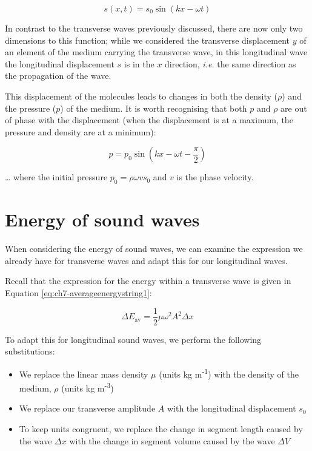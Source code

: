 \documentclass[
]{book}
\providecommand{\tightlist}{%
  \setlength{\itemsep}{0pt}\setlength{\parskip}{0pt}}
\begin{document}
\begin{equation}
s(x,t) = s_0 \sin (kx - \omega t)
\label{eq:ch9-soundwaveeq1}
\end{equation}

In contrast to the transverse waves previously discussed, there are now only two dimensions to this function; while we considered the transverse displacement \(y\) of an element of the medium carrying the transverse wave, in this longitudinal wave the longitudinal displacement \(s\) is in the \(x\) direction, \emph{i.e.} the same direction as the propagation of the wave.

This displacement of the molecules leads to changes in both the density (\(\rho\)) and the pressure (\(p\)) of the medium. It is worth recognising that both \(p\) and \(\rho\) are out of phase with the displacement (when the displacement is at a maximum, the pressure and density are at a minimum):

\begin{equation}
p = p_0 \sin (kx - \omega t - \frac{\pi}{2})
\label{eq:ch9-soundwaveeq2}
\end{equation}

\ldots{} where the initial pressure \(p_0 = \rho \omega v s_0\) and \(v\) is the phase velocity.

\hypertarget{sec-ch9-energysoundwaves}{%
\section{Energy of sound waves}\label{sec-ch9-energysoundwaves}}

When considering the energy of sound waves, we can examine the expression we already have for transverse waves and adapt this for our longitudinal waves.

Recall that the expression for the energy within a transverse wave is given in Equation \eqref{eq:ch7-averageenergystring1}:

\begin{equation}
\Delta E_{\mathrm{av}} = \frac{1}{2}\mu \omega^2 A^2 \Delta x
\end{equation}

To adapt this for longitudinal sound waves, we perform the following substitutions:

\begin{itemize}
\tightlist
\item
  We replace the linear mass density \(\mu\) (units kg m\textsuperscript{-1}) with the density of the medium, \(\rho\) (units kg m\textsuperscript{-3})
\item
  We replace our transverse amplitude \(A\) with the longitudinal displacement \(s_0\)
\item
  To keep units congruent, we replace the change in segment length caused by the wave \(\Delta x\) with the change in segment volume caused by the wave \(\Delta V\)
\end{itemize}
\end{document}
